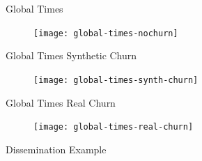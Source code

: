 \begin{frame}{Global Times}
	\begin{figure}
		\texttt{[image: global-times-nochurn]}
	\end{figure}
\end{frame}

\begin{frame}{Global Times Synthetic Churn}
	\begin{figure}
		\texttt{[image: global-times-synth-churn]}
	\end{figure}
\end{frame}

\begin{frame}{Global Times Real Churn}
	\begin{figure}
		\texttt{[image: global-times-real-churn]}
	\end{figure}
\end{frame}

\begin{frame}{Dissemination Example}
	\begin{tikzpicture}
	
	\end{tikzpicture}
\end{frame}





